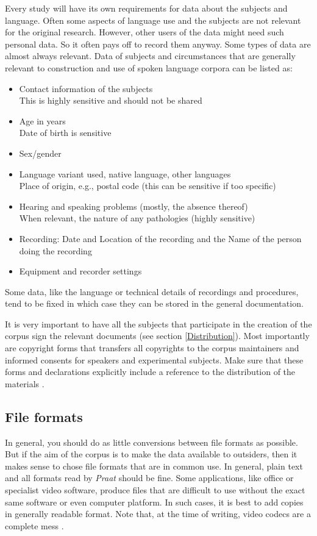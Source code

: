 \documentclass[10pt, a4paper]{article}
\begin{document}
Every study will have its own requirements for data about the subjects and language. Often some aspects of language use and the subjects are not relevant for the original research. However, other users of the data might need such personal data. So it often pays off to record them anyway. Some types of data are almost always relevant. Data of subjects and circumstances that are generally relevant to construction and use of spoken language corpora can be listed as:
\begin{itemize}
\item Contact information of the subjects\\
      This is highly sensitive and should not be shared
\item Age in years\\
      Date of birth is sensitive
\item Sex/gender
\item Language variant used, native language, other languages\\
      Place of origin, e.g., postal code (this can be sensitive if too specific)
\item Hearing and speaking problems (mostly, the absence thereof)\\
      When relevant, the nature of any pathologies (highly sensitive)
\item Recording: Date and Location of the recording and the Name of the person doing the recording
\item Equipment and recorder settings
\end{itemize}
Some data, like the language or technical details of recordings and procedures, tend to be fixed in which case they can be stored in the general documentation.

It is very important to have all the subjects that participate in the creation of the corpus sign the relevant documents (see section \ref{Distribution}). Most importantly are copyright forms that transfers all copyrights to the corpus maintainers and informed consents for speakers and experimental subjects. Make sure that these forms and declarations explicitly include a reference to the distribution of the materials \cite{VanSonetal2001,vanSon2008ifadv,VanSon2009Prom}.

\subsection{File formats}

In general, you should do as little conversions between file formats as possible. But if the aim of the corpus is to make the data available to outsiders, then it makes sense to chose file formats that are in common use. In general, plain text and all formats read by \emph{Praat} \cite{Praat} should be fine. Some applications, like office or specialist video software, produce files that are difficult to use without the exact same software or even computer platform. In such cases, it is best to add copies in generally readable format. Note that, at the time of writing, video codecs are a complete mess \cite{SimonPhipps13}.
\end{document}
